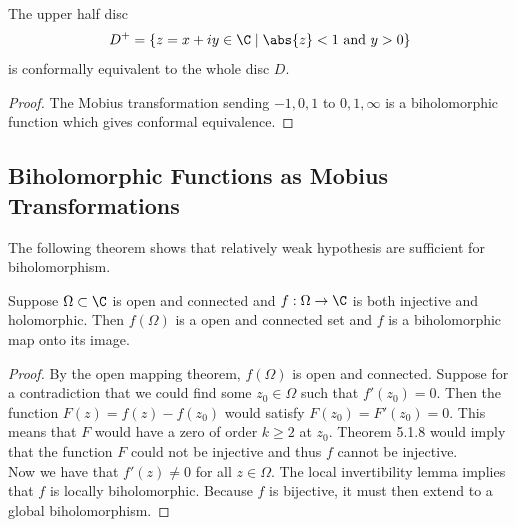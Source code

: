 \documentclass[a4paper]{article}
\begin{document}
\begin{prp}{}{} The upper half disc $$D^+=\{z=x+iy\in\C\;|\;\abs{z}<1\text{ and }y>0\}$$ is conformally equivalent to the whole disc $D$. 
\begin{proof}
The Mobius transformation sending $-1,0,1$ to $0,1,\infty$ is a biholomorphic function which gives conformal equivalence. 
\end{proof}
\end{prp}

\subsection{Biholomorphic Functions as Mobius Transformations}
The following theorem shows that relatively weak hypothesis are sufficient for biholomorphism. 

\begin{thm}{}{} Suppose $\Omega\subset\C$ is open and connected and $f:\Omega\to\C$ is both injective and holomorphic. Then $f(\Omega)$ is a open and connected set and $f$ is a biholomorphic map onto its image. 
\begin{proof}
By the open mapping theorem, $f(\Omega)$ is open and connected. Suppose for a contradiction that we could find some $z_0\in\Omega$ such that $f'(z_0)=0$. Then the function $F(z)=f(z)-f(z_0)$ would satisfy $F(z_0)=F'(z_0)=0$. This means that $F$ would have a zero of order $k\geq 2$ at $z_0$. Theorem 5.1.8 would imply that the function $F$ could not be injective and thus $f$ cannot be injective. \\

Now we have that $f'(z)\neq 0$ for all $z\in\Omega$. The local invertibility lemma implies that $f$ is locally biholomorphic. Because $f$ is bijective, it must then extend to a global biholomorphism. 
\end{proof}
\end{thm}
\end{document}
